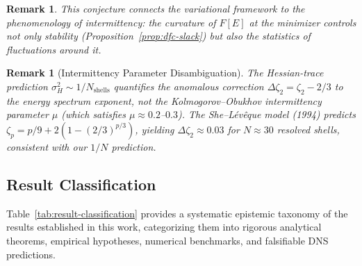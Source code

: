 \documentclass[12pt,a4paper]{article}
\theoremstyle{breakdef}
\theoremstyle{breakplain}
\theoremstyle{breakdef}
\newtheorem{remark}[definition]{Remark}
\begin{document}
\begin{remark}
This conjecture connects the variational framework to the phenomenology of intermittency: the curvature of $F[E]$ at the minimizer controls not only stability (Proposition~\ref{prop:dfc-slack}) but also the statistics of fluctuations around it.
\end{remark}

\begin{remark}[Intermittency Parameter Disambiguation]\label{rem:mu-disambiguation}
The Hessian-trace prediction $\sigma_H^2 \sim 1/N_{\mathrm{shells}}$ quantifies the anomalous correction $\Delta\zeta_2 = \zeta_2 - 2/3$ to the energy spectrum exponent, not the Kolmogorov--Obukhov intermittency parameter $\mu$ (which satisfies $\mu \approx 0.2$--$0.3$). The She--Lévêque model (1994) predicts $\zeta_p = p/9 + 2(1 - (2/3)^{p/3})$, yielding $\Delta\zeta_2 \approx 0.03$ for $N \approx 30$ resolved shells, consistent with our $1/N$ prediction.
\end{remark}

\subsection*{Result Classification}

Table~\ref{tab:result-classification} provides a systematic epistemic taxonomy of the results established in this work, categorizing them into rigorous analytical theorems, empirical hypotheses, numerical benchmarks, and falsifiable DNS predictions.
\end{document}
